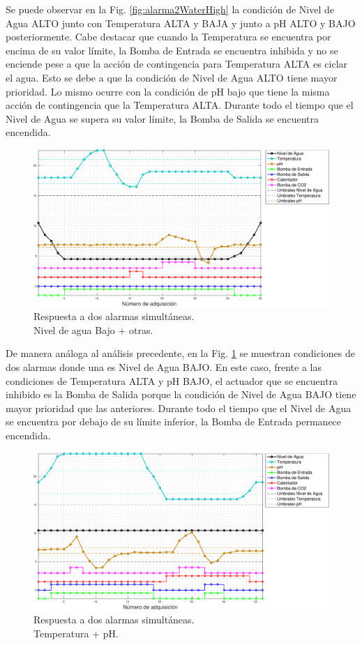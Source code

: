 Se puede observar en la Fig. \ref{fig:alarma2WaterHigh} la condición de Nivel de Agua ALTO junto con Temperatura ALTA y BAJA y junto a pH ALTO y BAJO posteriormente.  Cabe destacar que cuando la Temperatura se encuentra por encima de su valor límite, la Bomba de Entrada se encuentra inhibida y no se enciende pese a que la acción de contingencia para Temperatura ALTA es ciclar el agua.  Esto se debe a que la condición de Nivel de Agua ALTO tiene mayor prioridad.  Lo mismo ocurre con la condición de pH bajo que tiene la misma acción de contingencia que la Temperatura ALTA.  Durante todo el tiempo que el Nivel de Agua se supera su valor límite, la Bomba de Salida se encuentra encendida.

\begin{figure}
\centering
    \includegraphics[width=\textwidth]{./Figures/plot2waterLow.pdf}
	\caption{Respuesta a dos alarmas simultáneas.\\ Nivel de agua Bajo + otras.}
	\label{fig:alarma2WaterLow}
\end{figure}

De manera análoga al análisis precedente, en la Fig. \ref{fig:alarma2WaterLow} se muestran condiciones de dos alarmas donde una es Nivel de Agua BAJO.  En este caso, frente a las condiciones de Temperatura ALTA y pH BAJO, el actuador que se encuentra inhibido es la Bomba de Salida porque la condición de Nivel de Agua BAJO tiene mayor prioridad que las anteriores.  Durante todo el tiempo que el Nivel de Agua se encuentra por debajo de su límite inferior, la Bomba de Entrada permanece encendida.

\begin{figure}
\centering
    \includegraphics[width=\textwidth]{./Figures/plot2Temp.pdf}
	\caption{Respuesta a dos alarmas simultáneas.\\ Temperatura + pH.}
	\label{fig:alarma2Temp}
\end{figure}


